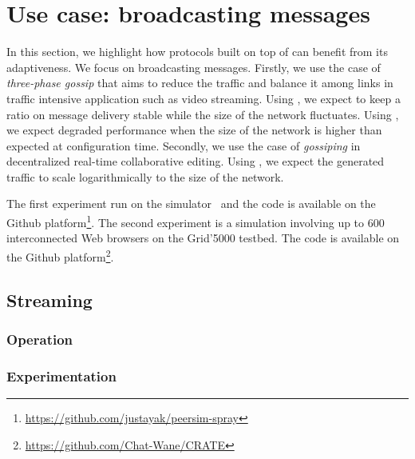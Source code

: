 
\section{Use case: broadcasting messages}


In this section, we highlight how protocols built on top of \SPRAY can benefit
from its adaptiveness. We focus on broadcasting messages. Firstly, we use the
case of \emph{three-phase gossip} that aims to reduce the traffic and balance it
among links in traffic intensive application such as video streaming. Using
\SPRAY, we expect to keep a ratio on message delivery stable while the size of
the network fluctuates. Using \CYCLON, we expect degraded performance when the
size of the network is higher than expected at configuration time. Secondly, we
use the case of \emph{gossiping} in decentralized real-time collaborative
editing. Using \SPRAY, we expect the generated traffic to scale logarithmically
to the size of the network.

The first experiment run on the \PEERSIM simulator~\cite{montresor2009peersim}
and the code is available on the Github
platform\footnote{\url{https://github.com/justayak/peersim-spray}}. The second
experiment is a simulation involving up to 600 interconnected Web browsers on
the Grid'5000 testbed. The code is available on the Github
platform\footnote{\url{https://github.com/Chat-Wane/CRATE}}.

\subsection{Streaming}

\subsubsection{Operation}

\subsubsection{Experimentation}

